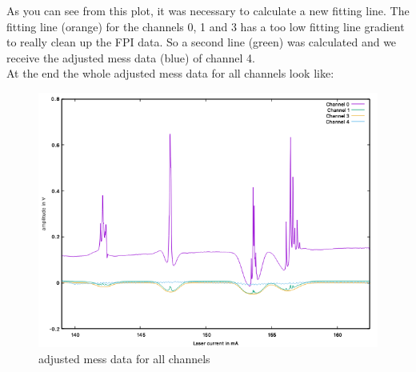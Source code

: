 As you can see from this plot, it was necessary to calculate a new fitting line.
The fitting line (orange) for the channels 0, 1 and 3 has a too low fitting line gradient to really clean up
the FPI data. So a second line (green) was calculated and we receive 
the adjusted mess data (blue) of channel 4. \\
At the end the whole adjusted mess data for all channels look like:\\
\begin{center}
    \begin{figure}[h]
        \centering
        \includegraphics[scale=0.5]{Bilder/Auswertung_Anna/clean_all.png}
        \caption{adjusted mess data for all channels}
        \label{fig:all}
    \end{figure}
\end{center}
\newpage
